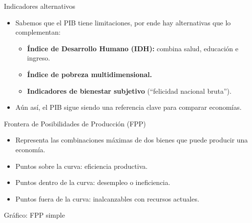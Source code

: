 \documentclass{beamer}
\begin{document}
\begin{frame}{Indicadores alternativos}
    \begin{itemize}
        \item Sabemos que el PIB tiene limitaciones, por ende hay alternativas que lo complementan:
        \begin{itemize}
            \item \textbf{Índice de Desarrollo Humano (IDH):} combina salud, educación e ingreso.
            \item \textbf{Índice de pobreza multidimensional.}
            \item \textbf{Indicadores de bienestar subjetivo} (“felicidad nacional bruta”).
        \end{itemize}
        \item Aún así, el PIB sigue siendo una referencia clave para comparar economías.
    \end{itemize}
\end{frame}

\begin{frame}{Frontera de Posibilidades de Producción (FPP)}
    \begin{itemize}
        \item Representa las combinaciones máximas de dos bienes que puede producir una economía.
        \item Puntos sobre la curva: eficiencia productiva.
        \item Puntos dentro de la curva: desempleo o ineficiencia.
        \item Puntos fuera de la curva: inalcanzables con recursos actuales.
    \end{itemize}
\end{frame}

\begin{frame}{Gráfico: FPP simple}
    \begin{center}
    \end{center}
\end{frame}
\end{document}
